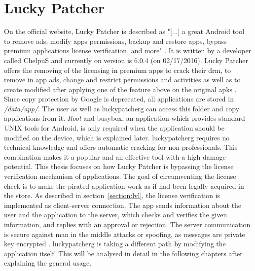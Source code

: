 \section{Lucky Patcher} \label{section:luckypatcher-explain}
On the official website, Lucky Patcher is described as "[...] a great Android tool to remove ads, modify apps permissions, backup and restore apps, bypass premium applications license verification, and more" \cite{luckyPatcherOfficial}.
It is written by a developer called ChelpuS and currently on version is 6.0.4 (on 02/17/2016).
\newline
Lucky Patcher offers the removing of the licensing in premium apps to crack their \gls{drm}, to remove in app ads, change and restrict permissions and activities as well as to create modified after applying one of the feature above on the original \gls{apk}s \cite{luckyPatcherOfficial}.
Since copy protection by Google is deprecated, all applications are stored in \textit{/data/app/}.
The user as well as \gls{luckypatcherg} can access this folder and copy applications from it.
\textit{Root} and busybox, an application which provides standard UNIX tools for Android\cite{busyboxApp}, is only required when the application should be modified on the device, which is explained later.
\gls{luckypatcherg} requires no technical knowledge and offers automatic cracking for non professionals.
This combination makes it a popular and an effective tool with a high damage potential. \cite{munteanLicense}
\newline
This thesis focuses on how Lucky Patcher is bypassing the license verification mechanism of applications.
The goal of circumventing the license check is to make the pirated application work as if had been legally acquired in the store.
As described in section~\ref{section:lvl}, the license verification is implemented as client-server connection.
The app sends information about the user and the application to the server, which checks and verifies the given information, and replies with an approval or rejection.
The server communication is secure against man in the middle attacks or spoofing, as messages are private key encrypted \cite{munteanLicense}.
\gls{luckypatcherg} is taking a different path by modifying the application itself. This will be analysed in detail in the following chapters after explaining the general usage.
\newline
